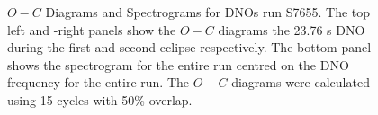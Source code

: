 \begin{figure}
\begin{narrow}{-1in}{0in}
\begin{tabular}{c}
\end{tabular}
\end{narrow}
\caption[$O-C$ Diagrams and Spectrograms for DNOs in run S7655]{$O-C$ Diagrams and Spectrograms for DNOs run S7655. The top left and -right panels show the $O-C$ diagrams the 23.76 s DNO during the first and second eclipse respectively. The bottom panel shows the spectrogram for the entire run centred on the DNO frequency for the entire run. The $O-C$ diagrams were calculated using 15 cycles with 50\% overlap. }
\label{S7655_DNO}
\end{figure}



